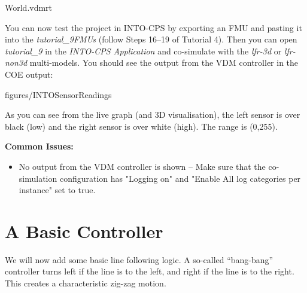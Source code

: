 \documentclass[11pt,a4paper]{../tutorial}
\begin{document}
\begin{instructions}
    \bigskip
    
    {World.vdmrt}

\item You can now test the project in INTO-CPS by exporting an FMU and pasting it into the \emph{tutorial\_9\pathsep{}FMUs} (follow Steps 16--19 of Tutorial 4). Then you can open \emph{tutorial\_9} in the \emph{INTO-CPS Application} and co-simulate with the \emph{lfr-3d} or \emph{lfr-non3d} multi-models. 
You should see the output from the VDM controller in the COE output:

    \begin{annotation}[width=0.99\linewidth,trim=0 70 0 0,clip]{figures/INTOSensorReadings}
    \end{annotation}

    As you can see from the live graph (and 3D visualisation), the left sensor is over black (low) and the right sensor is over white (high). The range is (0,255).

\textbf{Common Issues:}
\begin{itemize}
	\item No output from the VDM controller is shown -- Make sure that the co-simulation configuration has "Logging on" and "Enable All log categories per instance" set to true.
\end{itemize}

\end{instructions}

\section{A Basic Controller}

We will now add some basic line following logic. A so-called ``bang-bang'' controller turns left if the line is to the left, and right if the line is to the right. This creates a characteristic zig-zag motion.
\end{document}
